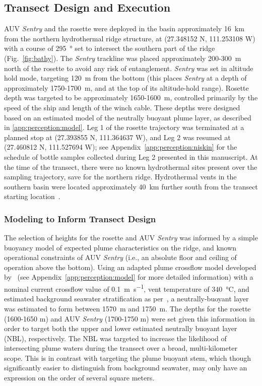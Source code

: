 \subsection{Transect Design and Execution}
AUV \emph{Sentry} and the rosette were deployed in the basin approximately \SI{16}{\kilo\meter} from the northern hydrothermal ridge structure, at (27.348152 N, 111.253108 W) with a course of \SI{295}{\degree} set to intersect the southern part of the ridge (Fig.~\ref{fig:bathy}). The \emph{Sentry} trackline was placed approximately 200-\SI{300}{\meter} north of the rosette to avoid any risk of entanglement. \emph{Sentry} was set in altitude hold mode, targeting \SI{120}{\meter} from the bottom (this places \emph{Sentry} at a depth of approximately 1750-\SI{1700}{\meter}, and at the top of its altitude-hold range). Rosette depth was targeted to be approximately 1650-\SI{1600}{\meter}, controlled primarily by the speed of the ship and length of the winch cable. These depths were designed based on an estimated model of the neutrally buoyant plume layer, as described in \cref{app:perception:model}. Leg 1 of the rosette trajectory was terminated at a planned stop at (27.393855 N, 111.364637 W), and Leg 2 was resumed at (27.460812 N, 111.527694 W); see Appendix~\ref{app:perception:niskin} for the schedule of bottle samples collected during Leg 2 presented in this manuscript. At the time of the transect, there were no known hydrothermal sites present over the sampling trajectory, save for the northern ridge. Hydrothermal vents in the southern basin were located approximately \SI{40}{\kilo\meter} further south from the transect starting location~\autocite{teske2016guaymas}.

\subsubsection{Modeling to Inform Transect Design}
\label{sec:afar_model}
The selection of heights for the rosette and AUV \emph{Sentry} was informed by a simple buoyancy model of expected plume characteristics on the ridge, and known operational constraints of AUV \emph{Sentry} (i.e., an absolute floor and ceiling of operation above the bottom). Using an adapted plume crossflow model developed by~\cite{tohidi2016highly} (see Appendix~\ref{app:perception:model} for more detailed information) with a nominal current crossflow value of \SI{0.1}{\meter\per\second}, vent temperature of \SI{340}{\celsius}, and estimated background seawater stratification as per~\cite{speer1989model}, a neutrally-buoyant layer was estimated to form between \SI{1570}{\meter} and \SI{1750}{\meter}. The depths for the rosette (1600-1650 m) and AUV \emph{Sentry} (1700-1750 m) were set given this information in order to target both the upper and lower estimated neutrally buoyant layer (NBL), respectively. The NBL was targeted to increase the likelihood of intersecting plume waters during the transect over a broad, multi-kilometer scope. This is in contrast with targeting the plume buoyant stem, which though significantly easier to distinguish from background seawater, may only have an expression on the order of several square meters.

